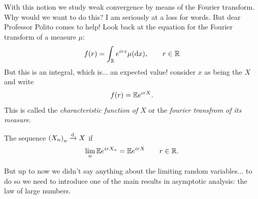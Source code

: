 \documentclass{report}
\begin{document}
With this notion we study weak convergence by means of the Fourier transform. Why would we want to do this? I am seriously at a loss for words. But dear Professor Polito comes to help! Look back at the equation for the Fourier transform of a measure $\mu$:
\[f(r)=\int_{\mathbb{R}}e^{irx}\mu(\mathop{}\!\mathrm{d} x),\qquad r\in\mathbb{R}\]
But this is an integral, which is... an expected value! consider $x$ as being the \rv{} $X$ and write
\[f(r)=\mathbb{E} e^{irX}.\]
This is called the \emph{characteristic function of $X$} or the \emph{fourier transfrom of its measure}.
\begin{corollary}
	The sequence ${(X_n)}_{n}\xrightarrow[]{\text{d}} X$ if
	\[\lim_n\mathbb{E} e^{irX_{n}}=\mathbb{E} e^{irX}\qquad r\in\mathbb{R}.\] 
\end{corollary}
But up to now we didn't say anything about the limiting random variables... to do so we need to introduce one of the main results in asymptotic analysis: the law of large numbers.
\end{document}
